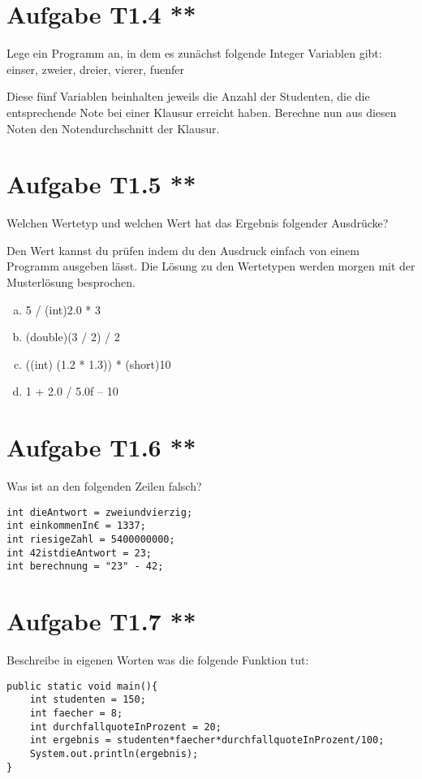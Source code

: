\documentclass[final,a4paper]{article}
\begin{document}
\section*{Aufgabe T1.4 **}
Lege ein Programm an, in dem es zunächst folgende Integer Variablen gibt: einser, zweier, dreier, vierer, fuenfer

Diese fünf Variablen beinhalten jeweils die Anzahl der Studenten, die die entsprechende Note bei einer Klausur erreicht haben. Berechne nun aus diesen Noten den Notendurchschnitt der Klausur.

\section*{Aufgabe T1.5 **}
Welchen Wertetyp und welchen Wert hat das Ergebnis folgender Ausdrücke? 

Den Wert kannst du prüfen indem du den Ausdruck einfach von einem Programm ausgeben lässt. Die Lösung zu den Wertetypen werden morgen mit der Musterlösung besprochen.
\begin{enumerate}[(a)]
\item 5 / (int)2.0 * 3
\item (double)(3 / 2) / 2
\item ((int) (1.2 * 1.3)) * (short)10
\item 1 + 2.0 / 5.0f – 10
\end{enumerate}

\section*{Aufgabe T1.6 **}
Was ist an den folgenden Zeilen falsch?
\begin{lstlisting}
int dieAntwort = zweiundvierzig;
int einkommenIn€ = 1337;
int riesigeZahl = 5400000000;
int 42istdieAntwort = 23; 
int berechnung = "23" - 42;
\end{lstlisting}

\section*{Aufgabe T1.7 **}
Beschreibe in eigenen Worten was die folgende Funktion tut:
\begin{lstlisting}
public static void main(){
	int studenten = 150;
	int faecher = 8;
	int durchfallquoteInProzent = 20;
	int ergebnis = studenten*faecher*durchfallquoteInProzent/100;
	System.out.println(ergebnis);
}
\end{lstlisting}
\end{document}
